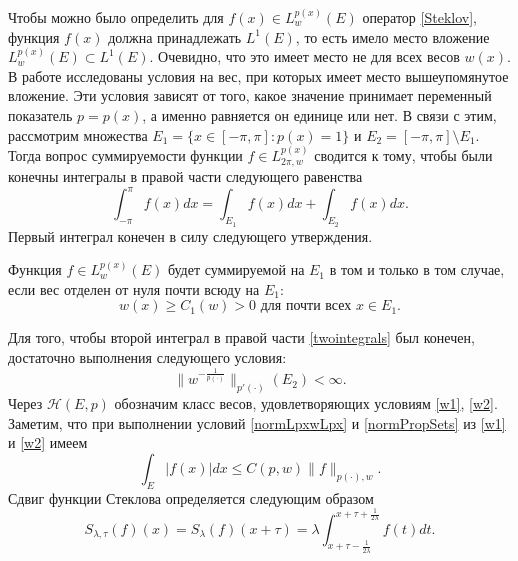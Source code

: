 Чтобы можно было определить для $f(x)\in L^{p(x)}_{w}(E)$ оператор \eqref{Steklov}, функция $f(x)$ должна принадлежать $L^1(E)$, то есть имело место вложение $L^{p(x)}_{w}(E)\subset L^1(E)$. Очевидно, что это имеет место не для всех весов $w(x)$. В работе \cite{SHETN1} исследованы условия на вес, при которых имеет место вышеупомянутое вложение. %
Эти условия зависят от того, какое значение принимает переменный показатель $p=p(x)$, а именно равняется он единице или нет.
В связи с этим, рассмотрим множества $E_1=\{x\in [-\pi,\pi]:p(x)=1\}$ и  $E_2=[-\pi,\pi]\setminus E_1$. Тогда вопрос суммируемости функции $f\in L^{p(x)}_{2\pi,w}$
сводится к тому, чтобы были конечны интегралы в правой части следующего равенства
\begin{equation}\label{twointegrals}
    \int_{-\pi}^{\pi}f(x)dx=\int_{E_1}f(x)dx+\int_{E_2}f(x)dx.
\end{equation}
Первый интеграл конечен в силу следующего утверждения.
\begin{lemma}
Функция $f \in L^{p(x)}_{w}(E)$ будет суммируемой на $E_1$ в том и только в том случае, если вес отделен от нуля почти всюду на $E_1$:
\begin{equation}
    w(x) \ge C_1(w) > 0 \text{ для почти всех } x \in E_1.\label{w1}
\end{equation}
\end{lemma}
\noindent Для того, чтобы второй интеграл в правой части \eqref{twointegrals} был конечен, достаточно выполнения следующего условия:
\begin{equation}
    \|w^{-\frac{1}{p(\cdot)}}\|_{p'(\cdot)}(E_2) < \infty.\label{w2}
\end{equation}
 Через $\mathcal{ H}(E,p)$ обозначим класс весов, удовлетворяющих условиям \eqref{w1}, \eqref{w2}.
Заметим, что  при выполнении условий \ref{normLpxwLpx} и \ref{normPropSets} из \eqref{w1} и \eqref{w2} имеем
\begin{equation}\label{fL1Finite}
  \int_E |f(x)|dx \le
  C(p,w) \|f\|_{p(\cdot),w}.
\end{equation}
Сдвиг функции Стеклова определяется следующим образом
\begin{equation}\label{SteklovShift}
  S_{\lambda,\tau}(f)(x)=S_{\lambda}(f)(x+\tau)=\lambda\int_{x+\tau-\frac 1{2\lambda}}^{x+\tau+\frac 1{2\lambda}}f(t)dt.
\end{equation}




